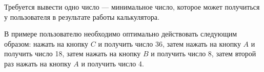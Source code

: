 \begin{problem}
\OutputFile

Требуется вывести одно число — минимальное число, которое может получиться у пользователя в результате работы калькулятора.

\Examples

\begin{example}
%
\end{example}

\Explanation

В примере пользователю необходимо оптимально действовать следующим образом: нажать на кнопку $C$ и получить число 36, затем нажать на кнопку $A$ и получить число 18, затем нажать на кнопку $B$ и получить число 8, затем второй раз нажать на кнопку $A$ и получить число 4.

\end{problem}
